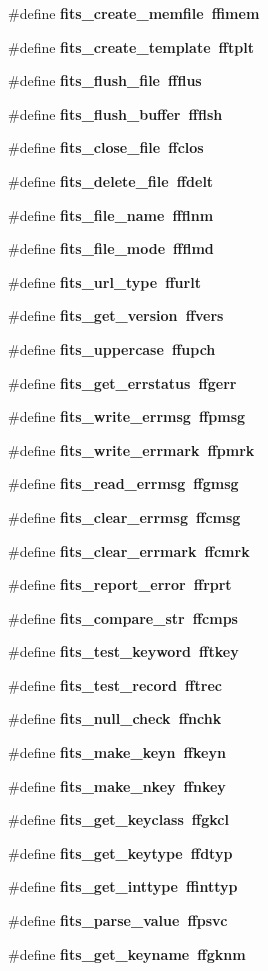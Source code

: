 \begin{CompactItemize}
\#define \bf{fits\_\-create\_\-memfile}~ffimem
\item 
\#define \bf{fits\_\-create\_\-template}~fftplt
\item 
\#define \bf{fits\_\-flush\_\-file}~ffflus
\item 
\#define \bf{fits\_\-flush\_\-buffer}~ffflsh
\item 
\#define \bf{fits\_\-close\_\-file}~ffclos
\item 
\#define \bf{fits\_\-delete\_\-file}~ffdelt
\item 
\#define \bf{fits\_\-file\_\-name}~ffflnm
\item 
\#define \bf{fits\_\-file\_\-mode}~ffflmd
\item 
\#define \bf{fits\_\-url\_\-type}~ffurlt
\item 
\#define \bf{fits\_\-get\_\-version}~ffvers
\item 
\#define \bf{fits\_\-uppercase}~ffupch
\item 
\#define \bf{fits\_\-get\_\-errstatus}~ffgerr
\item 
\#define \bf{fits\_\-write\_\-errmsg}~ffpmsg
\item 
\#define \bf{fits\_\-write\_\-errmark}~ffpmrk
\item 
\#define \bf{fits\_\-read\_\-errmsg}~ffgmsg
\item 
\#define \bf{fits\_\-clear\_\-errmsg}~ffcmsg
\item 
\#define \bf{fits\_\-clear\_\-errmark}~ffcmrk
\item 
\#define \bf{fits\_\-report\_\-error}~ffrprt
\item 
\#define \bf{fits\_\-compare\_\-str}~ffcmps
\item 
\#define \bf{fits\_\-test\_\-keyword}~fftkey
\item 
\#define \bf{fits\_\-test\_\-record}~fftrec
\item 
\#define \bf{fits\_\-null\_\-check}~ffnchk
\item 
\#define \bf{fits\_\-make\_\-keyn}~ffkeyn
\item 
\#define \bf{fits\_\-make\_\-nkey}~ffnkey
\item 
\#define \bf{fits\_\-get\_\-keyclass}~ffgkcl
\item 
\#define \bf{fits\_\-get\_\-keytype}~ffdtyp
\item 
\#define \bf{fits\_\-get\_\-inttype}~ffinttyp
\item 
\#define \bf{fits\_\-parse\_\-value}~ffpsvc
\item 
\#define \bf{fits\_\-get\_\-keyname}~ffgknm
\item 

\end{CompactItemize}
